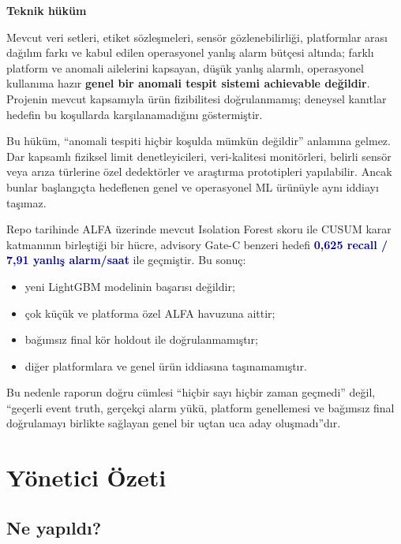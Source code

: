 \documentclass[11pt,a4paper,oneside]{report}
\newcommand{\metric}[1]{\textbf{\textcolor{Navy}{#1}}}
\newcommand{\fasaat}{yanlış alarm/saat}
\begin{document}
\begin{verdictbox}
\textbf{\large Teknik hüküm}

Mevcut veri setleri, etiket sözleşmeleri, sensör gözlenebilirliği, platformlar
arası dağılım farkı ve kabul edilen operasyonel yanlış alarm bütçesi altında;
farklı platform ve anomali ailelerini kapsayan, düşük yanlış alarmlı,
operasyonel kullanıma hazır \textbf{genel bir anomali tespit sistemi
achievable değildir}. Projenin mevcut kapsamıyla ürün fizibilitesi
doğrulanmamış; deneysel kanıtlar hedefin bu koşullarda karşılanamadığını
göstermiştir.

\medskip

Bu hüküm, ``anomali tespiti hiçbir koşulda mümkün değildir'' anlamına gelmez.
Dar kapsamlı fiziksel limit denetleyicileri, veri-kalitesi monitörleri,
belirli sensör veya arıza türlerine özel dedektörler ve araştırma prototipleri
yapılabilir. Ancak bunlar başlangıçta hedeflenen genel ve operasyonel ML
ürünüyle aynı iddiayı taşımaz.
\end{verdictbox}

\begin{warningbox}
Repo tarihinde ALFA üzerinde mevcut Isolation Forest skoru ile CUSUM karar
katmanının birleştiği bir hücre, advisory Gate-C benzeri hedefi
\metric{0,625 recall / 7,91 \fasaat} ile geçmiştir. Bu sonuç:
\begin{itemize}
  \item yeni LightGBM modelinin başarısı değildir;
  \item çok küçük ve platforma özel ALFA havuzuna aittir;
  \item bağımsız final kör holdout ile doğrulanmamıştır;
  \item diğer platformlara ve genel ürün iddiasına taşınamamıştır.
\end{itemize}
Bu nedenle raporun doğru cümlesi ``hiçbir sayı hiçbir zaman geçmedi'' değil,
``geçerli event truth, gerçekçi alarm yükü, platform genellemesi ve bağımsız
final doğrulamayı birlikte sağlayan genel bir uçtan uca aday oluşmadı''dır.
\end{warningbox}

\tableofcontents
\clearpage


\chapter{Yönetici Özeti}

\section{Ne yapıldı?}
\end{document}
